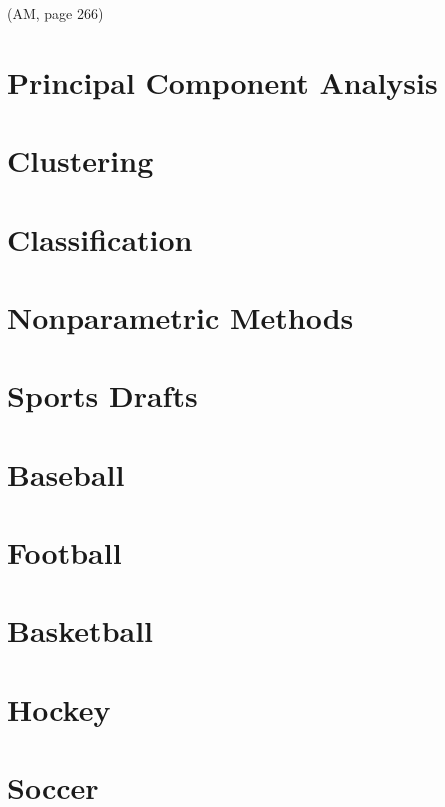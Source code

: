 \documentclass[
  11pt,
]{book}
\theoremstyle{definition}
\theoremstyle{definition}
\theoremstyle{definition}
\theoremstyle{definition}
\theoremstyle{remark}
\begin{document}
(AM, page 266)

\newpage

\hypertarget{principal-component-analysis}{%
\chapter{Principal Component Analysis}\label{principal-component-analysis}}

\hypertarget{clustering}{%
\chapter{Clustering}\label{clustering}}

\hypertarget{classification}{%
\chapter{Classification}\label{classification}}

\hypertarget{nonparametric-methods}{%
\chapter{Nonparametric Methods}\label{nonparametric-methods}}

\hypertarget{sports-drafts}{%
\chapter{Sports Drafts}\label{sports-drafts}}

\hypertarget{baseball-1}{%
\chapter{Baseball}\label{baseball-1}}

\hypertarget{football-1}{%
\chapter{Football}\label{football-1}}

\hypertarget{basketball-1}{%
\chapter{Basketball}\label{basketball-1}}

\hypertarget{hockey-1}{%
\chapter{Hockey}\label{hockey-1}}

\hypertarget{soccer-1}{%
\chapter{Soccer}\label{soccer-1}}

  
\end{document}
